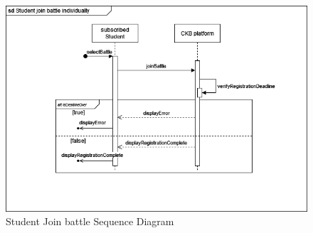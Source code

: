\begin{center}
    \begin{figure} [H]
        \begin{center}
            \includegraphics[width=0.9\linewidth]{Images/SequenceDiagrams/SD_8.png}
            \caption{Student Join battle Sequence Diagram}
            \label{fig: battle_alone_seq_diag}
        \end{center}
    \end{figure}
\end{center}

